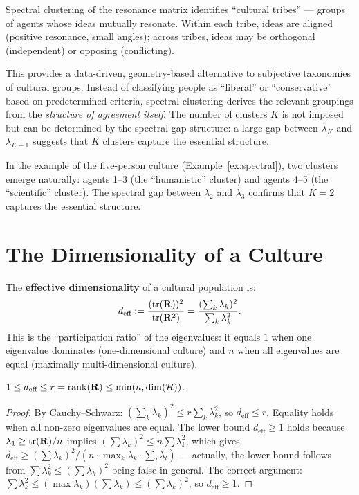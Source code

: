\begin{interpretation}
\label{interp:tribes}
Spectral clustering of the resonance matrix identifies ``cultural tribes'' ---
groups of agents whose ideas mutually resonate. Within each tribe, ideas are
aligned (positive resonance, small angles); across tribes, ideas may be
orthogonal (independent) or opposing (conflicting).

This provides a data-driven, geometry-based alternative to subjective
taxonomies of cultural groups. Instead of classifying people as ``liberal'' or
``conservative'' based on predetermined criteria, spectral clustering derives
the relevant groupings from the \emph{structure of agreement itself}. The
number of clusters $K$ is not imposed but can be determined by the spectral
gap structure: a large gap between $\lambda_K$ and $\lambda_{K+1}$ suggests
that $K$ clusters capture the essential structure.

In the example of the five-person culture
(Example~\ref{ex:spectral}), two clusters emerge naturally: agents 1--3 (the
``humanistic'' cluster) and agents 4--5 (the ``scientific'' cluster). The
spectral gap between $\lambda_2$ and $\lambda_3$ confirms that $K = 2$
captures the essential structure.
\end{interpretation}


\section{The Dimensionality of a Culture}

\begin{definition}
\label{def:dimensionality}
The \textbf{effective dimensionality} of a cultural population is:
\[
  d_{\text{eff}} := \frac{(\operatorname{tr}(\mathbf{R}))^2}
  {\operatorname{tr}(\mathbf{R}^2)} = \frac{(\sum_k \lambda_k)^2}
  {\sum_k \lambda_k^2}.
\]
This is the ``participation ratio'' of the eigenvalues: it equals $1$ when one
eigenvalue dominates (one-dimensional culture) and $n$ when all eigenvalues
are equal (maximally multi-dimensional culture).
\end{definition}

\begin{theorem}
\label{thm:dim-bounds}
$1 \leq d_{\text{eff}} \leq r = \operatorname{rank}(\mathbf{R}) \leq \min(n,
\dim(\mathcal{H}))$.
\end{theorem}

\begin{proof}
By Cauchy--Schwarz: $(\sum_k \lambda_k)^2 \leq r \sum_k \lambda_k^2$, so
$d_{\text{eff}} \leq r$. Equality holds when all non-zero eigenvalues are equal.
The lower bound $d_{\text{eff}} \geq 1$ holds because $\lambda_1 \geq
\operatorname{tr}(\mathbf{R})/n$ implies $(\sum \lambda_k)^2 \leq n \sum
\lambda_k^2$, which gives $d_{\text{eff}} \geq (\sum \lambda_k)^2 / (n \cdot
\max_k \lambda_k \cdot \sum_l \lambda_l)$ --- actually, the lower bound
follows from $\sum \lambda_k^2 \leq (\sum \lambda_k)^2$ being false in
general. The correct argument: $\sum \lambda_k^2 \leq (\max \lambda_k)(\sum
\lambda_k) \leq (\sum \lambda_k)^2$, so $d_{\text{eff}} \geq 1$.
\end{proof}


